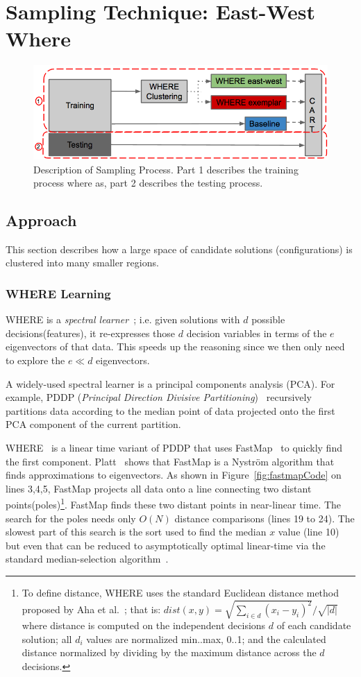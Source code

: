 \documentclass{sig-alternative}
\newcommand{\fig}[1]{Figure~\ref{fig:#1}}
\begin{document}
\section{Sampling Technique: East-West Where}
\begin{figure}[!t]
\includegraphics[width=0.9\linewidth]{Figures/SamplingProcess.png}
\caption{Description of Sampling Process. Part 1 describes the training process where as, part 2 describes the testing process.}\label{fig:Sampling Process}
\end{figure}
\subsection{Approach}
This section describes how a large space of candidate solutions (configurations) is clustered into many smaller regions.
\subsubsection{WHERE Learning}\label{sec:spectral}


WHERE is a {\em spectral learner}~\cite{kamvar2003spectral}; i.e. given solutions with $d$ possible decisions(features), it re-expresses those $d$ decision variables in terms of the $e$ eigenvectors of that data.
This speeds up the reasoning since we then only need to explore the $e\ll d$   eigenvectors.

A widely-used spectral learner is a principal components analysis (PCA). For example, PDDP ({\em Principal Direction Divisive Partitioning})~\cite{boley1998principal} recursively partitions data according to the median point of data projected onto the first PCA component of the current partition.

WHERE~\cite{me12d} is a linear time variant of PDDP  that uses FastMap~\cite{Faloutsos1995} to quickly find the first component.
Platt~\cite{platt05} shows that FastMap is a  Nystr\"om algorithm that finds approximations to eigenvectors.
As shown in \fig{fastmapCode} on lines 3,4,5, FastMap  projects all data onto a line connecting two distant points(poles)\footnote{
To define distance, WHERE uses the standard Euclidean distance method proposed by Aha et al.~\cite{aha91}; that is: $dist(x,y)= \sqrt{\sum_{i\in d} (x_i - y_i)^2}/\sqrt{ \left\vert{d}\right\vert }$ where distance is computed on the independent decisions $d$ of each candidate solution; all $d_i$ values are normalized min..max, 0..1; and the calculated distance normalized by dividing by the maximum distance across the $d$ decisions.}. 
FastMap finds these two distant points in near-linear time. 
The search for the poles needs only $O(N)$ distance comparisons (lines 19 to 24).
The slowest part of this search is the sort used to find the median $x$ value (line 10) but even that can be reduced to  asymptotically optimal linear-time via the standard median-selection algorithm~\cite{hoare61}.
\end{document}
